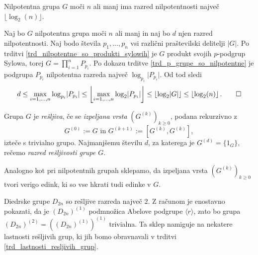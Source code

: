 \begin{posledica}\label{psl_ocena_razreda_nilpotentnosti}
    Nilpotentna grupa $G$ moči $n$ ali manj ima razred nilpotentnosti največ $\lfloor \log_2(n) \rfloor$.
\end{posledica}
\begin{dokaz}
    Naj bo $G$ nilpotentna grupa moči $n$ ali manj in naj bo $d$ njen razred nilpotentnosti. Naj bodo števila $p_1, \ldots, p_n$ vsi različni praštevilski delitelji $\lvert G \rvert$. Po trditvi \ref{trd_nilpotentne_so_produkti_sylowih} je $G$ produkt svojih $p$-podgrup Sylowa, torej $G = \prod_{i  = 1}^{n} P_{p_i}$.
    Po dokazu trditve \ref{trd_p_grupe_so_nilpotentne} je podgrupa $P_{p_i}$ nilpotentna razreda največ $\log_{p_i} \lvert P_{p_i} \rvert$. Od tod sledi \begin{equation*}
    d \le \max_{i = 1, \ldots, n} \log_{p_i} \lvert P_{p_i} \rvert \le \left\lfloor \max_{i = 1, \ldots, n} \log_{2} \lvert P_{p_i} \rvert \right\rfloor \le \left\lfloor \log_2 \lvert G \rvert  \right\rfloor \le \left\lfloor \log_2(n)  \right\rfloor. \qedhere
    \end{equation*}
\end{dokaz}

\begin{definicija}
    \label{def_resljiva_grupa}
    Grupa $G$ je \emph{rešljiva}, če se \emph{izpeljana vrsta} $(G^{(k)})_{k \ge 0}$, podana rekurzivno z \begin{equation*}
        G^{(0)} := G \text{ in } G^{(k + 1)} := [G^{(k)}, G^{(k)}],
        \end{equation*}  
        izteče s trivialno grupo. Najmanjšemu številu $d$, za katerega je $G^{(d)} = \{ 1_G \}$, rečemo \emph{razred rešljivosti grupe $G$}.    
    \end{definicija}

    Analogno kot pri nilpotentnih grupah sklepamo, da izpeljana vrsta $(G^{(k)})_{k \ge 0}$ tvori verigo edink, ki so vse hkrati tudi edinke v $G$.
    
    \begin{primer}
        Diedrske grupe $D_{2n}$ so rešljive razreda največ $2$. Z računom je enostavno pokazati, da je $(D_{2n})^{(1)}$ podmnožica Abelove podgrupe $\langle r \rangle$, zato bo grupa $(D_{2n})^{(2)} = ((D_{2n})^{(1)})^{(1)}$ trivialna.
        Ta sklep namiguje na nekatere lastnosti rešljivih grup, ki jih bomo obravnavali v trditvi \ref{trd_lastnosti_resljivih_grup}. 
    \end{primer}

